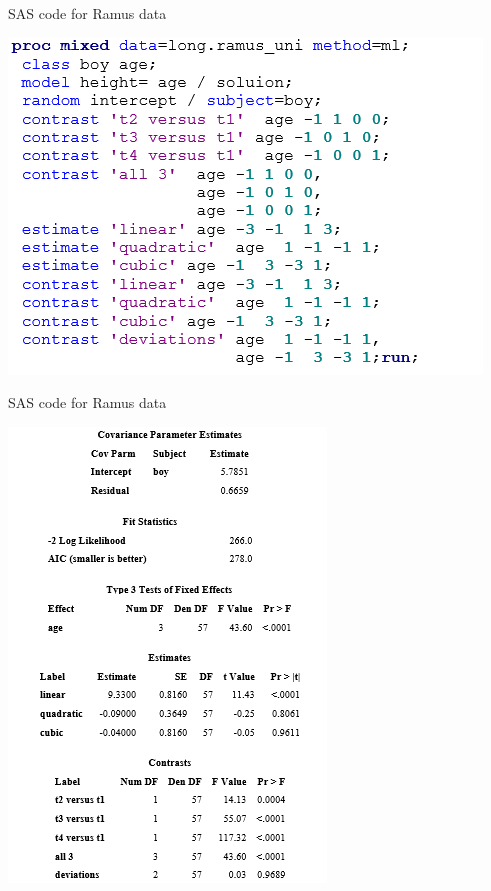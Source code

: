 \documentclass[
  9pt,
  ignorenonframetext,
]{beamer}
\begin{document}
\begin{frame}{SAS code for Ramus data}
\protect\hypertarget{sas-code-for-ramus-data}{}
\begin{center}\includegraphics[width=0.5\linewidth]{figs_L5/f4} \end{center}
\end{frame}

\begin{frame}{SAS code for Ramus data}
\protect\hypertarget{sas-code-for-ramus-data-1}{}
\begin{center}\includegraphics[width=0.5\linewidth]{figs_L5/f4.2} \end{center}
\end{frame}
\end{document}
